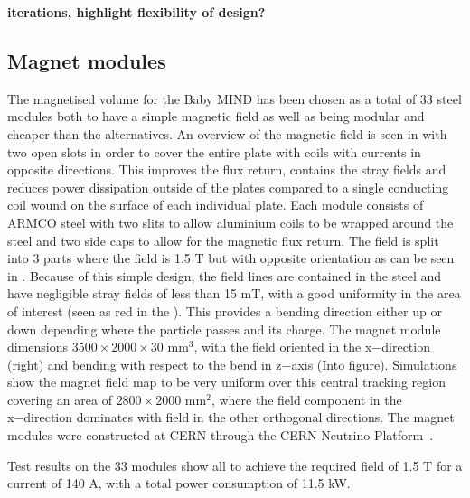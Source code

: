 \textbf{iterations, highlight flexibility of design?}
\subsection{Magnet modules}

The magnetised volume for the Baby MIND has been chosen as a total of 33 steel modules both to have a simple magnetic field as well as being modular and cheaper than the alternatives. An overview of the magnetic field is seen in  with two open slots in order to cover the entire plate with coils with currents in opposite directions. This improves the flux return, contains the stray fields and reduces power dissipation outside of the plates compared to a single conducting coil wound on the surface of each individual plate. Each module consists of ARMCO steel with two slits to allow aluminium coils to be wrapped around the steel and two side caps to allow for the magnetic flux return. The field is split into 3 parts where the field is 1.5 T but with opposite orientation as can be seen in . Because of this simple design, the field lines are contained in the steel and have negligible stray fields of less than 15 mT, with a good uniformity in the area of interest (seen as red in the ). This provides a bending direction either up or down depending where the particle passes and its charge. The magnet module dimensions $3500 \times 2000 \times 30$ mm$^3$, with the field oriented in the x−direction (right) and bending with respect to the bend in z−axis (Into figure). Simulations show the magnet field map to be very uniform over this central tracking region covering an area of $2800 \times 2000$ mm$^2$, where the field component in the x−direction dominates with field in the other orthogonal directions. The magnet modules were constructed at CERN through the CERN Neutrino Platform~\cite{50MagnetMIND}.

Test results on the 33 modules show all to achieve the required field of 1.5 T for a current of 140 A, with a total power consumption of 11.5 kW.


